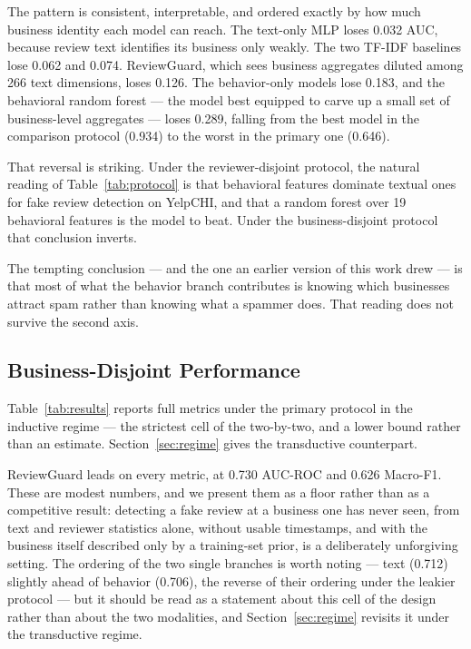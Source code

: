 \documentclass[conference]{IEEEtran}
\begin{document}
The pattern is consistent, interpretable, and ordered exactly by how much
business identity each model can reach. The text-only MLP loses 0.032 AUC,
because review text identifies its business only weakly. The two TF-IDF
baselines lose 0.062 and 0.074. ReviewGuard, which sees business aggregates
diluted among 266 text dimensions, loses 0.126. The behavior-only models lose
0.183, and the behavioral random forest --- the model best equipped to carve up
a small set of business-level aggregates --- loses 0.289, falling from the best
model in the comparison protocol (0.934) to the worst in the primary one
(0.646).

That reversal is striking. Under the reviewer-disjoint protocol, the natural
reading of Table~\ref{tab:protocol} is that behavioral features dominate textual
ones for fake review detection on YelpCHI, and that a random forest over 19
behavioral features is the model to beat. Under the business-disjoint protocol
that conclusion inverts.

The tempting conclusion --- and the one an earlier version of this work drew ---
is that most of what the behavior branch contributes is knowing which businesses
attract spam rather than knowing what a spammer does. That reading does not
survive the second axis.

\subsection{Business-Disjoint Performance}

Table~\ref{tab:results} reports full metrics under the primary protocol in the
inductive regime --- the strictest cell of the two-by-two, and a lower bound
rather than an estimate. Section~\ref{sec:regime} gives the transductive
counterpart.




ReviewGuard leads on every metric, at 0.730 AUC-ROC and 0.626 Macro-F1. These
are modest numbers, and we present them as a floor rather than as a competitive
result: detecting a fake review at a business one has never seen, from text and
reviewer statistics alone, without usable timestamps, and with the business
itself described only by a training-set prior, is a deliberately unforgiving
setting. The ordering of the two single branches is worth noting --- text
(0.712) slightly ahead of behavior (0.706), the reverse of their ordering under
the leakier protocol --- but it should be read as a statement about this cell of
the design rather than about the two modalities, and
Section~\ref{sec:regime} revisits it under the transductive regime.
\end{document}

